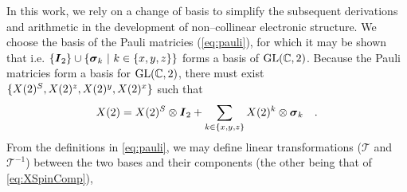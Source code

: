 In this work, we rely on a change of basis to simplify the subsequent derivations and arithmetic in the development
of non--collinear electronic structure. We choose the basis of the Pauli matricies (\cref{eq:pauli}), for which it may
be shown that 
i.e. $\{ \vc{I}_2 \} \cup \left\lbrace \vc{\sigma}_k \text{ }\vert\text{ } k \in \{x,y,z\} \right\rbrace$ forms a basis of  $\GL{C}{2}$.
Because the Pauli matricies form a basis for $\GL{C}{2}$, there must exist $\{ \spinor{2}{X}^S, \spinor{2}{X}^z, \spinor{2}{X}^y, \spinor{2}{X}^x \}$
such that
\begin{equation}
\label{eq:XPauliBasis}
\spinor{2}{X} = \spinor{2}{X}^S \otimes \vc{I}_2 + \sum_{k \in \{x,y,z\} } \spinor{2}{X}^k \otimes \vc{\sigma}_k \quad.
\end{equation}
From the definitions in \cref{eq:pauli}, we may define linear transformations ($\mathscr{T}$ and $\mathscr{T}^{-1}$) between the two bases and their
components (the other being that of \cref{eq:XSpinComp}),

